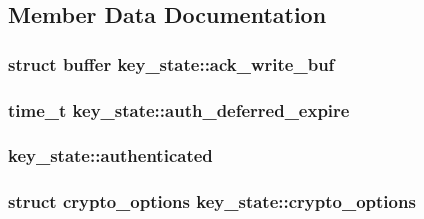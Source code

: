 \subsection{Member Data Documentation}
\hypertarget{structkey__state_a2fbf1804a3fd7c2d50bc7582319e2bdb}{}
\subsubsection[{ack\+\_\+write\+\_\+buf}]{\setlength{\rightskip}{0pt plus 5cm}struct {\bf buffer} key\+\_\+state\+::ack\+\_\+write\+\_\+buf}\label{structkey__state_a2fbf1804a3fd7c2d50bc7582319e2bdb}
\hypertarget{structkey__state_ad8a078848dbcb00d4255b6cae875b9a4}{}
\subsubsection[{auth\+\_\+deferred\+\_\+expire}]{\setlength{\rightskip}{0pt plus 5cm}time\+\_\+t key\+\_\+state\+::auth\+\_\+deferred\+\_\+expire}\label{structkey__state_ad8a078848dbcb00d4255b6cae875b9a4}
\hypertarget{structkey__state_a0db9f9f7a64b1668c0422bcb24ee714f}{}
\subsubsection[{authenticated}]{ key\+\_\+state\+::authenticated}\label{structkey__state_a0db9f9f7a64b1668c0422bcb24ee714f}
\hypertarget{structkey__state_a2432af1bf9969f63599688a7adf3306d}{}
\subsubsection[{crypto\+\_\+options}]{\setlength{\rightskip}{0pt plus 5cm}struct {\bf crypto\+\_\+options} key\+\_\+state\+::crypto\+\_\+options}\label{structkey__state_a2432af1bf9969f63599688a7adf3306d}
\hypertarget{structkey__state_a7b4fcfc00225857f9d9dbd8cf8b0a213}{}
